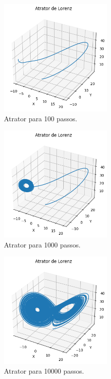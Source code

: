 \documentclass[12pt, a4paper]{article}
\begin{document}
    \begin{figure}[H]
        \centering
        \includegraphics[width=0.5\textwidth]{img/attrator100.png}
        \caption{Atrator para 100 passos.}
        \label{fig:lorenz102}
    \end{figure}
    
    \begin{figure}[H]
        \centering
        \includegraphics[width=0.5\textwidth]{img/attrator1000.png}
        \caption{Atrator para 1000 passos.}
        \label{fig:lorenz103}
    \end{figure}
    
    \begin{figure}[H]
        \centering
        \includegraphics[width=0.5\textwidth]{img/attrator10000.png}
        \caption{Atrator para 10000 passos.}
        \label{fig:lorenz104}
    \end{figure}
    
\end{document}
